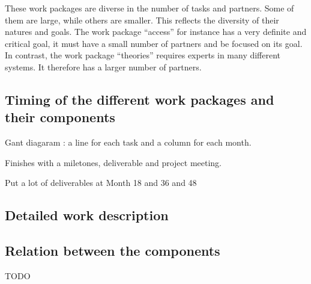These work packages are diverse in the number of tasks and
partners. Some of them are large, while others are smaller. This
reflects the diversity of their natures and goals. The work package
``access'' for instance has a very definite and critical goal, it must
have a small number of partners and be focused on its goal. In
contrast, the work package ``theories'' requires experts in many
different systems.  It therefore has a larger number of partners.


\wpfigstyle{\scriptsize\setlength{\tabcolsep}{2pt}}
\wpfig%

\subsection{Timing of the different work packages and their components}

Gant diagaram : a line for each task
and a column for each month.

Finishes with a miletones, deliverable and project meeting.

Put a lot of deliverables at Month 18 and 36 and 48

\ganttchart[draft,xscale=.32] 


\subsection{Detailed work description}

\begin{workplan}

















\end{workplan}



\subsection{Relation between the components}


{\color{red} TODO}
